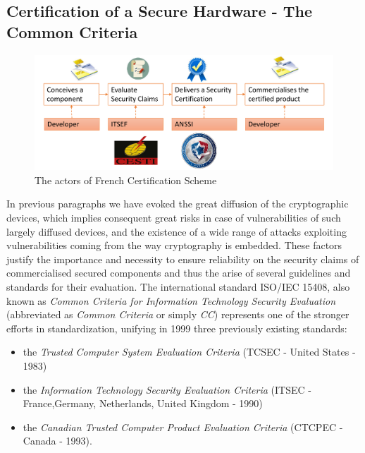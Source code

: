 \subsection{Certification of a Secure Hardware - The Common Criteria}
\begin{figure}
\includegraphics[width=\textwidth]{../Figures/ITSEF_ANSSI2.pdf} 
\caption{The actors of French Certification Scheme}
\end{figure}
In previous paragraphs we have evoked the great diffusion of the cryptographic devices, which implies consequent great risks in case of vulnerabilities of such largely diffused devices, and the existence of a wide range of attacks exploiting vulnerabilities coming from the way cryptography is embedded. These factors justify the importance and necessity to ensure reliability on the security claims of commercialised secured components and thus the arise of several guidelines and standards for their evaluation. The international standard ISO/IEC 15408, also known as \emph{Common Criteria for Information Technology Security Evaluation} (abbreviated as \emph{Common Criteria} or simply \emph{CC}) represents one of the stronger efforts in standardization, unifying in 1999 three previously existing standards:
\begin{itemize}
\item the \emph{Trusted Computer System Evaluation Criteria} (TCSEC - United States - 1983)
\item the \emph{Information Technology Security Evaluation Criteria} (ITSEC - France,Germany, Netherlands, United Kingdom - 1990)
\item the \emph{Canadian Trusted Computer Product Evaluation Criteria} (CTCPEC - Canada - 1993).
\end{itemize}


